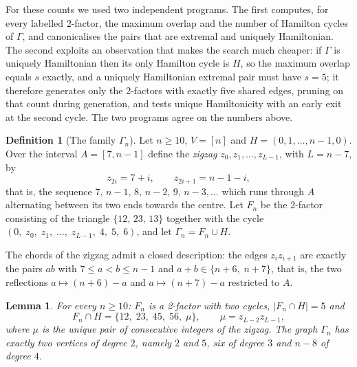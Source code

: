 \documentclass[11pt,a4paper]{article}
\newtheorem{lemma}[theorem]{Lemma}
\theoremstyle{definition}
\newtheorem{definition}[theorem]{Definition}
\theoremstyle{remark}
\begin{document}
For these counts we used two independent programs. The first computes, for every labelled 2-factor, the maximum overlap and the number of Hamilton cycles of $\Gamma$, and canonicalises the pairs that are extremal and uniquely Hamiltonian. The second exploits an observation that makes the search much cheaper: if $\Gamma$ is uniquely Hamiltonian then its only Hamilton cycle is $H$, so the maximum overlap equals $s$ exactly, and a uniquely Hamiltonian extremal pair must have $s=5$; it therefore generates only the 2-factors with exactly five shared edges, pruning on that count during generation, and tests unique Hamiltonicity with an early exit at the second cycle. The two programs agree on the numbers above.

\begin{definition}[The family $\Gamma_n$]\label{def:gamma}
Let $n\ge10$, $V=[n]$ and $H=(0,1,\dots,n-1,0)$. Over the interval $A=[7,n-1]$ define the \emph{zigzag} $z_0,z_1,\dots,z_{L-1}$, with $L=n-7$, by
\[
z_{2i}=7+i,\qquad z_{2i+1}=n-1-i ,
\]
that is, the sequence $7,\,n-1,\,8,\,n-2,\,9,\,n-3,\dots$ which runs through $A$ alternating between its two ends towards the centre. Let $F_n$ be the 2-factor consisting of the triangle $\{12,\,23,\,13\}$ together with the cycle $(0,\;z_0,\;z_1,\;\dots,\;z_{L-1},\;4,\;5,\;6)$, and let $\Gamma_n=F_n\cup H$.
\end{definition}

The chords of the zigzag admit a closed description: the edges $z_iz_{i+1}$ are exactly the pairs $ab$ with $7\le a<b\le n-1$ and $a+b\in\{n+6,\;n+7\}$, that is, the two reflections $a\mapsto(n+6)-a$ and $a\mapsto(n+7)-a$ restricted to $A$.

\begin{lemma}\label{lem:gammabasic}
For every $n\ge10$: $F_n$ is a 2-factor with two cycles, $|F_n\cap H|=5$ and
\[
F_n\cap H=\{12,\;23,\;45,\;56,\;\mu\},\qquad \mu=z_{L-2}z_{L-1},
\]
where $\mu$ is the unique pair of consecutive integers of the zigzag. The graph $\Gamma_n$ has exactly two vertices of degree $2$, namely $2$ and $5$, six of degree $3$ and $n-8$ of degree $4$.
\end{lemma}
\end{document}
